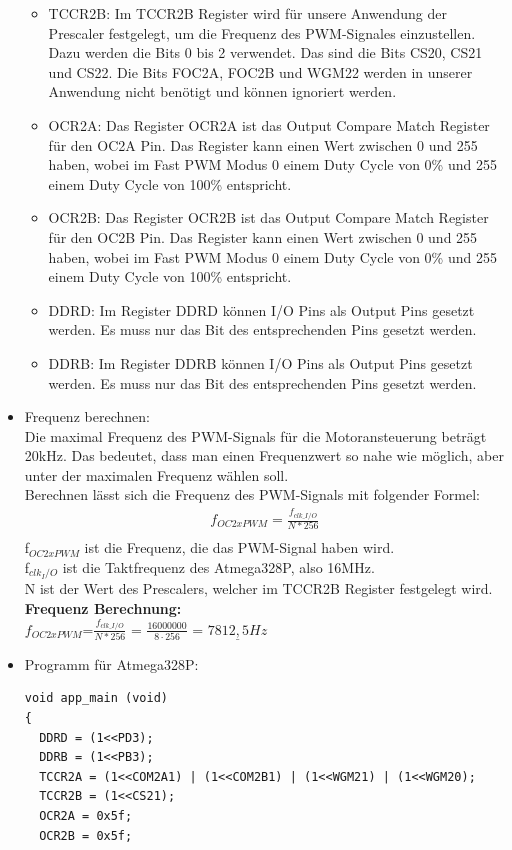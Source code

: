 \begin{itemize}
\begin{itemize}
\begin{itemize}
\end{itemize} 
\item TCCR2B: Im TCCR2B Register wird für unsere Anwendung der Prescaler festgelegt, um die Frequenz des \ac{PWM}-Signales einzustellen. Dazu werden die Bits 0 bis 2 verwendet. Das sind die Bits CS20, CS21 und CS22. Die Bits FOC2A, FOC2B und WGM22 werden in unserer Anwendung nicht benötigt und können ignoriert werden. \\
\item OCR2A: Das Register OCR2A ist das Output Compare Match Register für den OC2A Pin. Das Register kann einen Wert zwischen 0 und 255 haben, wobei im Fast \ac{PWM} Modus 0 einem Duty Cycle von 0\% und 255 einem Duty Cycle von 100\% entspricht.\\
\item OCR2B: Das Register OCR2B ist das Output Compare Match Register für den OC2B Pin. Das Register kann einen Wert zwischen 0 und 255 haben, wobei im Fast \ac{PWM} Modus 0 einem Duty Cycle von 0\% und 255 einem Duty Cycle von 100\% entspricht.\\
\item DDRD: Im Register DDRD können I/O Pins als Output Pins gesetzt werden. Es muss nur das Bit des entsprechenden Pins gesetzt werden.\\
\item DDRB: Im Register DDRB können I/O Pins als Output Pins gesetzt werden. Es muss nur das Bit des entsprechenden Pins gesetzt werden.\\
\end{itemize}
\item Frequenz berechnen:\\
Die maximal Frequenz des \ac{PWM}-Signals für die Motoransteuerung beträgt 20kHz. Das bedeutet, dass man einen Frequenzwert so nahe wie möglich, aber unter der maximalen Frequenz wählen soll.\\
Berechnen lässt sich die Frequenz des \ac{PWM}-Signals mit folgender Formel:
\begin{align*}
f_{OC2xPWM}=\frac{f_{clk\_I/O}}{N*256} \\
\end{align*} 
f$_{OC2xPWM}$ ist die Frequenz, die das \ac{PWM}-Signal haben wird.\\
f$_{clk_I/O}$ ist die Taktfrequenz des Atmega328P, also 16MHz. \\
N ist der Wert des Prescalers, welcher im TCCR2B Register festgelegt wird. \\

\textbf{Frequenz Berechnung:}\\
$f_{OC2xPWM}$=$\frac{f_{clk\_I/O}}{N*256}$ = $\frac{16000000}{8 \cdot 256}$ = $\underline{7812,5Hz}$
\item Programm für Atmega328P: \\
\begin{lstlisting}[caption=$\mu$C-Programm,style=C]
void app_main (void)
{
  DDRD = (1<<PD3);
  DDRB = (1<<PB3);
  TCCR2A = (1<<COM2A1) | (1<<COM2B1) | (1<<WGM21) | (1<<WGM20);
  TCCR2B = (1<<CS21);
  OCR2A = 0x5f;
  OCR2B = 0x5f;
  

\end{lstlisting}
\end{itemize}

